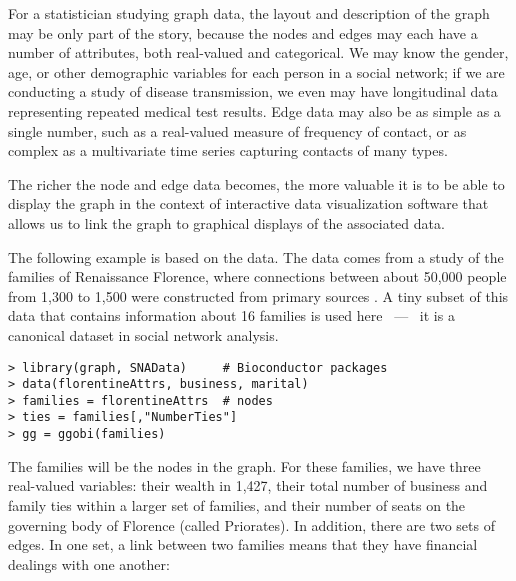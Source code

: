 
For a statistician studying graph data, the layout and description of
the graph may be only part of the story, because the nodes and edges
may each have a number of attributes, both real-valued and
categorical.  We may know the gender, age, or other demographic
variables for each person in a social network; if we are conducting a
study of disease transmission, we even may have longitudinal data
representing repeated medical test results.  Edge data may also be as
simple as a single number, such as a real-valued measure of frequency
of contact, or as complex as a multivariate time series capturing
contacts of many types.

The richer the node and edge data becomes, the more valuable it is to
be able to display the graph in the context of interactive data
visualization software that allows us to link the graph to graphical
displays of the associated data.





The following example is based on the  data.
The data comes from a study of the families of Renaissance Florence,
where connections between about 50,000 people from 1,300 to 1,500 were
constructed from primary sources \cite{Padgett93}.  A tiny subset of
this data that contains information about 16 families is used here
~---~ it is a canonical dataset in social network analysis.

\begin{verbatim}
> library(graph, SNAData)     # Bioconductor packages
> data(florentineAttrs, business, marital)
> families = florentineAttrs  # nodes
> ties = families[,"NumberTies"]
> gg = ggobi(families)
\end{verbatim}

The families will be the nodes in the graph.  For these families, we
have three real-valued variables: their wealth in 1,427, their total
number of business and family ties within a larger set of families,
and their number of seats on the governing body of Florence (called
Priorates).  In addition, there are two sets of edges.  In one set, a
link between two families means that they have financial dealings with
one another: 

